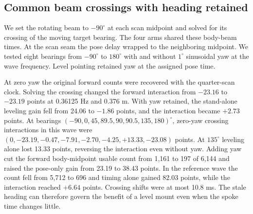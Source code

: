 \subsection{Common beam crossings with heading retained}

We set the rotating beam to $-90^\circ$ at each scan midpoint and solved for its crossing of the moving target bearing. The four arms shared these body-beam times. At the scan seam the pose delay wrapped to the neighboring midpoint. We tested eight bearings from $-90^\circ$ to $180^\circ$ with and without $1^\circ$ sinusoidal yaw at the wave frequency. Level pointing retained yaw at the assigned pose time.

At zero yaw the original forward counts were recovered with the quarter-scan clock. Solving the crossing changed the forward interaction from $-23.16$ to $-23.19$ points at 0.36125 Hz and 0.376 m. With yaw retained, the stand-alone leveling gain fell from 24.06 to $-1.86$ points, and the interaction became $+2.73$ points. At bearings $(-90,0,45,89.5,90,90.5,135,180)^\circ$, zero-yaw crossing interactions in this wave were $(0,-23.19,-0.47,-7.91,-2.70,-4.25,+13.33,-23.08)$ points. At $135^\circ$ leveling alone lost 13.33 points, reversing the interaction even without yaw. Adding yaw cut the forward body-midpoint usable count from 1,161 to 197 of 6,144 and raised the pose-only gain from 23.19 to 38.43 points. In the reference wave the count fell from 5,712 to 696 and timing alone gained 82.03 points, while the interaction reached $+6.64$ points. Crossing shifts were at most 10.8 ms. The stale heading can therefore govern the benefit of a level mount even when the spoke time changes little.
